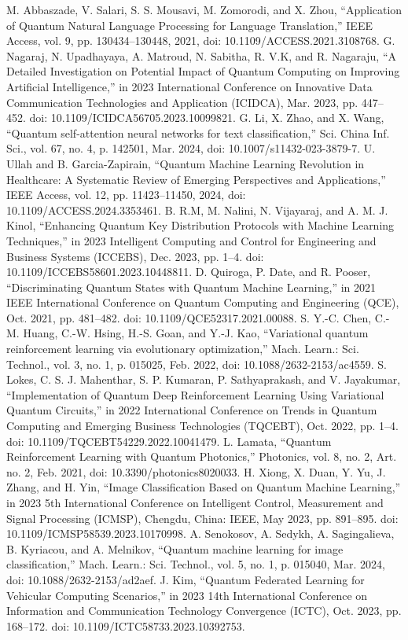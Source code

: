 \documentclass[conference]{IEEEtran}
\begin{document}
\begin{thebibliography}{00}
 M. Abbaszade, V. Salari, S. S. Mousavi, M. Zomorodi, and X. Zhou, “Application of Quantum Natural Language Processing for Language Translation,” IEEE Access, vol. 9, pp. 130434–130448, 2021, doi: 10.1109/ACCESS.2021.3108768.
 G. Nagaraj, N. Upadhayaya, A. Matroud, N. Sabitha, R. V.K, and R. Nagaraju, “A Detailed Investigation on Potential Impact of Quantum Computing on Improving Artificial Intelligence,” in 2023 International Conference on Innovative Data Communication Technologies and Application (ICIDCA), Mar. 2023, pp. 447–452. doi: 10.1109/ICIDCA56705.2023.10099821.
 G. Li, X. Zhao, and X. Wang, “Quantum self-attention neural networks for text classification,” Sci. China Inf. Sci., vol. 67, no. 4, p. 142501, Mar. 2024, doi: 10.1007/s11432-023-3879-7.
 U. Ullah and B. Garcia-Zapirain, “Quantum Machine Learning Revolution in Healthcare: A Systematic Review of Emerging Perspectives and Applications,” IEEE Access, vol. 12, pp. 11423–11450, 2024, doi: 10.1109/ACCESS.2024.3353461.
 B. R.M, M. Nalini, N. Vijayaraj, and A. M. J. Kinol, “Enhancing Quantum Key Distribution Protocols with Machine Learning Techniques,” in 2023 Intelligent Computing and Control for Engineering and Business Systems (ICCEBS), Dec. 2023, pp. 1–4. doi: 10.1109/ICCEBS58601.2023.10448811.
 D. Quiroga, P. Date, and R. Pooser, “Discriminating Quantum States with Quantum Machine Learning,” in 2021 IEEE International Conference on Quantum Computing and Engineering (QCE), Oct. 2021, pp. 481–482. doi: 10.1109/QCE52317.2021.00088.
 S. Y.-C. Chen, C.-M. Huang, C.-W. Hsing, H.-S. Goan, and Y.-J. Kao, “Variational quantum reinforcement learning via evolutionary optimization,” Mach. Learn.: Sci. Technol., vol. 3, no. 1, p. 015025, Feb. 2022, doi: 10.1088/2632-2153/ac4559.
 S. Lokes, C. S. J. Mahenthar, S. P. Kumaran, P. Sathyaprakash, and V. Jayakumar, “Implementation of Quantum Deep Reinforcement Learning Using Variational Quantum Circuits,” in 2022 International Conference on Trends in Quantum Computing and Emerging Business Technologies (TQCEBT), Oct. 2022, pp. 1–4. doi: 10.1109/TQCEBT54229.2022.10041479.
 L. Lamata, “Quantum Reinforcement Learning with Quantum Photonics,” Photonics, vol. 8, no. 2, Art. no. 2, Feb. 2021, doi: 10.3390/photonics8020033.
 H. Xiong, X. Duan, Y. Yu, J. Zhang, and H. Yin, “Image Classification Based on Quantum Machine Learning,” in 2023 5th International Conference on Intelligent Control, Measurement and Signal Processing (ICMSP), Chengdu, China: IEEE, May 2023, pp. 891–895. doi: 10.1109/ICMSP58539.2023.10170998.
 A. Senokosov, A. Sedykh, A. Sagingalieva, B. Kyriacou, and A. Melnikov, “Quantum machine learning for image classification,” Mach. Learn.: Sci. Technol., vol. 5, no. 1, p. 015040, Mar. 2024, doi: 10.1088/2632-2153/ad2aef.
 J. Kim, “Quantum Federated Learning for Vehicular Computing Scenarios,” in 2023 14th International Conference on Information and Communication Technology Convergence (ICTC), Oct. 2023, pp. 168–172. doi: 10.1109/ICTC58733.2023.10392753.
\end{thebibliography}
\end{document}
